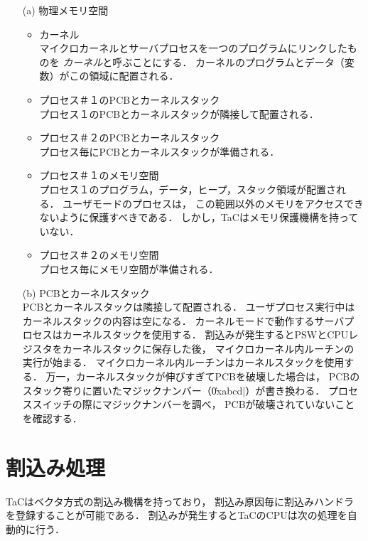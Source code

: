 \begin{enumerate}
\item[(a)] 物理メモリ空間
  \begin{itemize}
  \item カーネル \\
    マイクロカーネルとサーバプロセスを一つのプログラムにリンクしたものを
    \emph{カーネル}と呼ぶことにする．
    カーネルのプログラムとデータ（変数）がこの領域に配置される．
  \item プロセス＃１のPCBとカーネルスタック \\
    プロセス１のPCBとカーネルスタックが隣接して配置される．
  \item プロセス＃２のPCBとカーネルスタック \\
    プロセス毎にPCBとカーネルスタックが準備される．
  \item プロセス＃１のメモリ空間 \\
    プロセス１のプログラム，データ，ヒープ，スタック領域が配置される．
    ユーザモードのプロセスは，
    この範囲以外のメモリをアクセスできないように保護すべきである．
    しかし，TaCはメモリ保護機構を持っていない．
  \item プロセス＃２のメモリ空間 \\
    プロセス毎にメモリ空間が準備される．
  \end{itemize}
\item[(b)] PCBとカーネルスタック \\
  PCBとカーネルスタックは隣接して配置される．
  ユーザプロセス実行中はカーネルスタックの内容は空になる．
  カーネルモードで動作するサーバプロセスはカーネルスタックを使用する．
  割込みが発生するとPSWとCPUレジスタをカーネルスタックに保存した後，
  マイクロカーネル内ルーチンの実行が始まる．
  マイクロカーネル内ルーチンはカーネルスタックを使用する．
  万一，カーネルスタックが伸びすぎてPCBを破壊した場合は，
  PCBのスタック寄りに置いたマジックナンバー（\|0xabcd|）が書き換わる．
  プロセススイッチの際にマジックナンバーを調べ，
  PCBが破壊されていないことを確認する．
\end{enumerate}

\section{割込み処理}
\label{tacosInterrupt}
TaCはベクタ方式の割込み機構を持っており，
割込み原因毎に割込みハンドラを登録することが可能である．
割込みが発生するとTaCのCPUは次の処理を自動的に行う．

